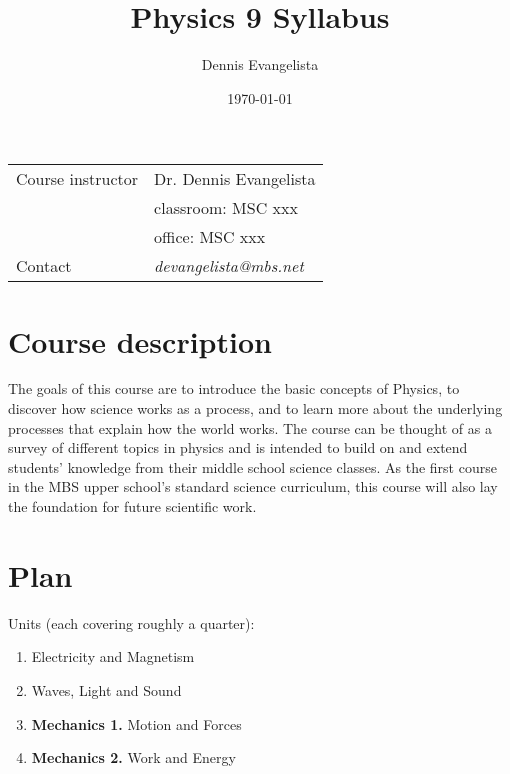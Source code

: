 \documentclass{article}
\title{Physics 9 Syllabus}
\author{Dennis Evangelista}
\date{\today}
\begin{document}

\begin{table}[h]
\begin{tabular}{ll}
\toprule
Course instructor & Dr. Dennis Evangelista \\
& classroom: MSC xxx \\
& office: MSC xxx \\
Contact & \emph{devangelista@mbs.net} \\
\bottomrule
\end{tabular}
\end{table}

\section{Course description}
The goals of this course are to introduce the basic concepts of Physics, to discover how science works as a process, and to learn more about the underlying processes that explain how the world works. The course can be thought of as a survey of different topics in physics and is intended to build on and extend students' knowledge from their middle school science classes. As the first course in the MBS upper school’s standard science curriculum, this course will also lay the foundation
for future scientific work.

\section{Plan}
Units (each covering roughly a quarter):
\begin{enumerate}
\item Electricity and Magnetism
\item Waves, Light and Sound
\item \textbf{Mechanics 1.} Motion and Forces
\item \textbf{Mechanics 2.} Work and Energy
\end{enumerate}
\end{document}
